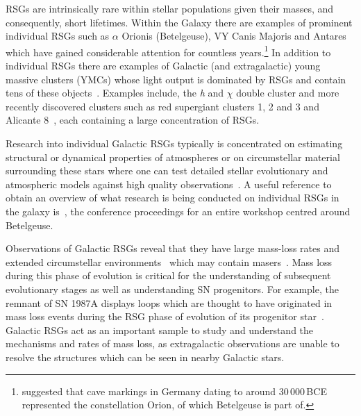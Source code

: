 RSGs are intrinsically rare within stellar populations given their masses, and consequently, short lifetimes.
Within the Galaxy there are examples of prominent individual RSGs such as $\alpha$ Orionis (Betelgeuse), VY Canis Majoris and Antares which have gained considerable attention for countless years.\footnote{\cite{2003UppOR..59...51R} suggested that cave markings in Germany dating to around 30\,000\,BCE represented the constellation Orion, of which Betelgeuse is part of.}
In addition to individual RSGs there are examples of Galactic (and extragalactic) young massive clusters (YMCs) whose light output is dominated by RSGs and contain tens of these objects~\citep{2014ApJ...788...58G}.
Examples include, the {\it h} and $\chi$ double cluster and more recently discovered clusters such as  red supergiant clusters 1, 2 and 3 and Alicante 8~\citep[RSGC01, RSGC02, RSGC03;][respectively; \citealt{2010A&A...513A..74N}]{2006ApJ...643.1166F,2007ApJ...671..781D,2009A&A...498..109C}, each containing a large concentration of RSGs.

Research into individual Galactic RSGs typically is concentrated on estimating structural or dynamical properties of atmospheres or on circumstellar material surrounding these stars where one can test detailed stellar evolutionary and atmospheric models against high quality observations~\citep[e.g.][]{2014A&A...561A..15C}.
A useful reference to obtain an overview of what research is being conducted on individual RSGs in the galaxy is~\cite{2013EAS....60.....K}, the conference proceedings for an entire workshop centred around Betelgeuse.

Observations of Galactic RSGs reveal that they have large mass-loss rates
\citep[10$^{-(6\pm 1)}$\,M$_{\odot}$\,yr$^{-1}$;][]{Danchi94, Richards13,2016AJ....151...51S} and extended circumstellar environments~\citep{Smith01,2014MNRAS.437L...1W} which may contain masers~\citep[e.g.][]{Schuster06,2012ApJ...744...23Z}.
Mass loss during this phase of evolution is critical for the understanding of subsequent evolutionary stages as well as understanding SN progenitors.
For example, the remnant of SN 1987A displays loops which are thought to have originated in mass loss events during the RSG phase of evolution of its progenitor star~\citep[][and references therein]{Humphreys13}.
Galactic RSGs act as an important sample to study and understand the mechanisms and rates of mass loss, as extragalactic observations are unable to resolve the structures which can be seen in nearby Galactic stars.

